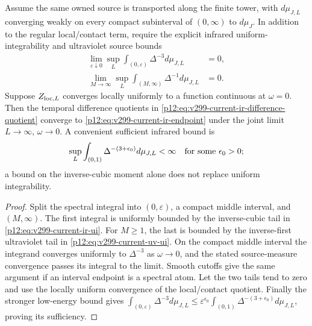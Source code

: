 \documentclass[12pt,a4paper]{article}
\begin{document}
\begin{corollary}
\label{p12:cor:v299-current-ir-uniform-transport}
Assume the same owned source is transported along the finite tower, with
$d\mu_{J,L}$ converging weakly on every compact subinterval of $(0,\infty)$
to $d\mu_J$.  In addition to the regular local/contact term, require the
explicit infrared uniform-integrability and ultraviolet source bounds
\begin{align}
 \lim_{\varepsilon\downarrow0}\sup_L
   \int_{(0,\varepsilon)}\Delta^{-3}d\mu_{J,L}&=0,
   \label{p12:eq:v299-current-ir-ui}\\
 \lim_{M\to\infty}\sup_L
   \int_{(M,\infty)}\Delta^{-1}d\mu_{J,L}&=0.
   \label{p12:eq:v299-current-uv-ui}
\end{align}
Suppose $Z_{{\rm loc},L}$ converges locally uniformly to a function continuous
at $\omega=0$.  Then the temporal difference quotients in
\eqref{p12:eq:v299-current-ir-difference-quotient} converge to
\eqref{p12:eq:v299-current-ir-endpoint} under the joint limit
$L\to\infty$, $\omega\to0$.  A convenient sufficient infrared bound is
\[
 \sup_L\int_{(0,1)}\Delta^{-(3+\epsilon_0)}d\mu_{J,L}<\infty
 \quad\hbox{for some }\epsilon_0>0;
\]
a bound on the inverse-cubic moment alone does not replace uniform
integrability.
\end{corollary}

\begin{proof}
Split the spectral integral into $(0,\varepsilon)$, a compact middle
interval, and $(M,\infty)$.  The first integral is uniformly bounded by the
inverse-cubic tail in \eqref{p12:eq:v299-current-ir-ui}.  For $M\ge1$, the
last is bounded by the inverse-first ultraviolet tail in
\eqref{p12:eq:v299-current-uv-ui}.  On the compact middle interval the
integrand converges uniformly to $\Delta^{-3}$ as $\omega\to0$, and the
stated source-measure convergence passes its integral to the limit.  Smooth
cutoffs give the same argument if an interval endpoint is a spectral atom.
Let the two tails tend to zero and use the locally uniform convergence of
the local/contact quotient.  Finally the stronger low-energy bound gives
$\int_{(0,\varepsilon)}\Delta^{-3}d\mu_{J,L}\le
\varepsilon^{\epsilon_0}\int_{(0,1)}\Delta^{-(3+\epsilon_0)}d\mu_{J,L}$,
proving its sufficiency.
\end{proof}
\end{document}

